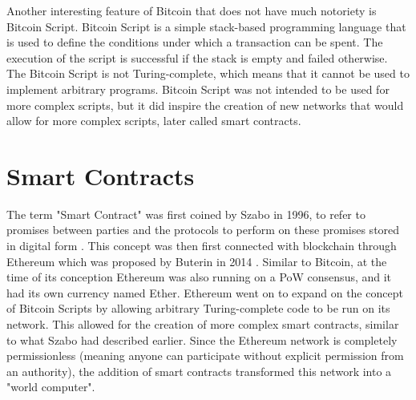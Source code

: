 Another interesting feature of Bitcoin that does not have much notoriety is Bitcoin Script. Bitcoin Script is a simple stack-based programming language that is used to define the conditions under which a transaction can be spent. The execution of the script is successful if the stack is empty and failed otherwise. The Bitcoin Script is not Turing-complete, which means that it cannot be used to implement arbitrary programs. Bitcoin Script was not intended to be used for more complex scripts, but it did inspire the creation of new networks that would allow for more complex scripts, later called smart contracts.

\section{Smart Contracts}
The term "Smart Contract" was first coined by Szabo in 1996, to refer to promises between parties and the protocols to perform on these promises stored in digital form \cite{szabo_smart_1996}. This concept was then first connected with blockchain through Ethereum which was proposed by Buterin in 2014 \cite{buterin_ethereum_2014}. Similar to Bitcoin, at the time of its conception Ethereum was also running on a \ac{PoW} consensus, and it had its own currency named Ether. Ethereum went on to expand on the concept of Bitcoin Scripts by allowing arbitrary Turing-complete code to be run on its network. This allowed for the creation of more complex smart contracts, similar to what Szabo had described earlier.
Since the Ethereum network is completely permissionless (meaning anyone can participate without explicit permission from an authority), the addition of smart contracts transformed this network into a "world computer".

